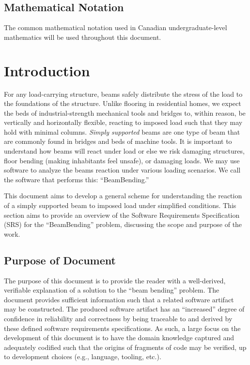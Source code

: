 \documentclass[12pt]{article}
\begin{document}
\subsection{Mathematical Notation}

The common mathematical notation used in Canadian undergraduate-level
mathematics will be used throughout this document.

\newpage



\section{Introduction}

For any load-carrying structure, beams safely distribute the stress of the load
to the foundations of the structure. Unlike flooring in residential homes, we
expect the beds of industrial-strength mechanical tools and bridges to, within
reason, be vertically and horizontally flexible, reacting to imposed load such
that they may hold with minimal columns. \textit{Simply supported} beams are one
type of beam that are commonly found in bridges and beds of machine tools. It is
important to understand how beams will react under load or else we risk damaging
structures, floor bending (making inhabitants feel unsafe), or damaging loads.
We may use software to analyze the beams reaction under various loading
scenarios. We call the software that performs this: ``BeamBending.''

This document aims to develop a general scheme for understanding the reaction of
a simply supported beam to imposed load under simplified conditions. This
section aims to provide an overview of the Software Requirements Specification
(SRS) for the ``BeamBending'' problem, discussing the scope and purpose of the
work.

\subsection{Purpose of Document}

The purpose of this document is to provide the reader with a well-derived,
verifiable explanation of a solution to the ``beam bending'' problem. The
document provides sufficient information such that a related software artifact
may be constructed. The produced software artifact has an ``increased'' degree
of confidence in reliability and correctness by being traceable to and derived
by these defined software requirements specifications. As such, a large focus on
the development of this document is to have the domain knowledge captured and
adequately codified such that the origins of fragments of code may be verified,
up to development choices (e.g., language, tooling, etc.).
\end{document}
